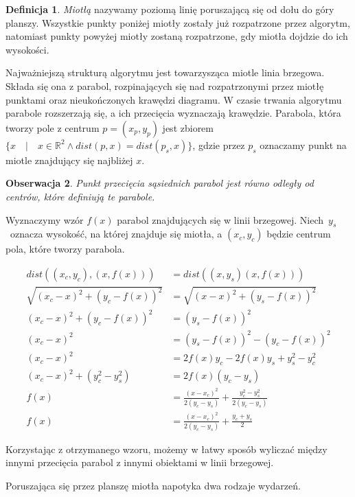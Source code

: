 \documentclass[declaration,shortabstract, inz]{iithesis}
\theoremstyle{definition} \newtheorem{definition}{Definicja}[]
\theoremstyle{plain} \newtheorem{remark}[definition]{Obserwacja}
\theoremstyle{plain} \newtheorem{theorem}[definition]{Twierdzenie}
\theoremstyle{plain} \newtheorem{example}{Przykład}[definition]
\theoremstyle{plain} \newtheorem{lemma}[definition]{Lemat}
\begin{document}
\begin{definition}
\textit{Miotłą} nazywamy poziomą linię poruszającą się od dołu do góry planszy. Wszystkie punkty poniżej miotły zostały już rozpatrzone przez algorytm, natomiast punkty powyżej miotły zostaną rozpatrzone, gdy miotła dojdzie do ich wysokości.
\end{definition}

Najważniejszą strukturą algorytmu jest towarzysząca miotle linia brzegowa. Składa się ona z parabol, rozpinających się nad rozpatrzonymi przez miotłę punktami oraz nieukończonych krawędzi diagramu. W czasie trwania algorytmu parabole rozszerzają się, a ich przecięcia wyznaczają krawędzie. Parabola, która tworzy pole z centrum $p = (x_p, y_p)$ jest zbiorem $\{ x \quad | \quad x \in \mathbb{R}^2 \land dist(p, x) = dist(p_s, x) \}$, gdzie przez $p_s$ oznaczamy punkt na miotle znajdujący się najbliżej $x$. 

\begin{remark}
Punkt przecięcia sąsiednich parabol jest równo odległy od centrów, które definiują te parabole.
\end{remark}

Wyznaczymy wzór $f(x)$ parabol znajdujących się w linii brzegowej.
Niech~$y_s$~oznacza wysokość, na której znajduje się miotła, a $(x_c, y_c)$ będzie centrum pola, które tworzy parabola. 

\begin{align*}
	dist((x_c, y_c), (x, f(x))) &= dist((x, y_s) (x, f(x))) \\
	\sqrt{(x_c - x)^2 + (y_c - f(x))^2} &= \sqrt{(x - x)^2 + (y_s - f(x))^2} \\
	(x_c - x)^2 + (y_c - f(x))^2 &= (y_s - f(x))^2 \\
	(x_c - x)^2 &= (y_s - f(x))^2 - (y_c - f(x))^2 \\ 
	(x_c - x)^2 &= 2f(x)y_c - 2f(x)y_s + y_s^2 - y_c^2 \\
	(x_c - x)^2 + (y_c^2 - y_s^2) &= 2f(x)(y_c - y_s) \\
	f(x) &= \frac{(x - x_c)^2}{2(y_c - y_s)} + \frac{y_c^2 - y_s^2}{2(y_c - y_s)} \\
	f(x) &= \frac{(x - x_c)^2}{2(y_c - y_s)} + \frac{y_c + y_s}{2}
\end{align*}

Korzystając z otrzymanego wzoru, możemy w łatwy sposób wyliczać między innymi przecięcia parabol z innymi obiektami w linii brzegowej.

Poruszająca się przez planszę miotła napotyka dwa rodzaje wydarzeń.
\end{document}
